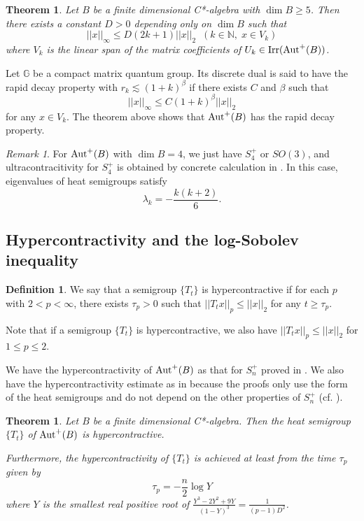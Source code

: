 \documentclass[12pt]{amsart}
\theoremstyle{plain} %
\newtheorem{theorem}[equation]{Theorem}
\theoremstyle{definition}
\newtheorem{definition}[equation]{Definition}
\theoremstyle{remark}
\newtheorem{remark}[equation]{Remark}
\begin{document}
\begin{theorem}
Let $B$ be a finite dimensional C*-algebra with $\dim B\geq5$. Then there exists a constant $D>0$ depending only on $\dim B$ such that 
\[||x||_{\infty}\leq D(2k+1)||x||_2\;\;(k\in \mathbb{N},\;x\in V_k)\]
where $V_k$ is the linear span of the matrix coefficients of $U_k\in{\rm Irr}({\rm Aut}^+(B))$.
\end{theorem}

Let $\mathbb{G}$ be a compact matrix quantum group. Its discrete dual is said to have the rapid decay property with $r_k\lesssim (1+k)^\beta$ if there exists $C$ and $\beta$ such that 
\[||x||_{\infty}\leq C(1+k)^{\beta}||x||_2\]
for any $x\in V_k$. 
The theorem above shows that ${\rm Aut}^+(B)$ has the rapid decay property. 

\begin{remark}
For ${\rm Aut}^+(B)$ with $\dim B=4$, we just have $S_4^+$ or $SO(3)$, and ultracontracitivity for $S_4^+$ is obtained by concrete calculation in \cite[Section 2.2]{FHLUZ}. In this case, eigenvalues of heat semigroups satisfy
\[\lambda_k=-\frac{k(k+2)}{6}.\]
\end{remark}

\subsection{Hypercontractivity and the log-Sobolev inequality}

\begin{definition}
We say that a semigroup $\{T_t\}$ is hypercontractive if for each $p$ with $2<p<\infty$, there exists $\tau_p>0$ such that $||T_tx||_p\leq||x||_2$ for any $t\geq\tau_p$.
\end{definition}

Note that if a semigroup $\{T_t\}$ is hypercontractive, we also have $||T_tx||_p\leq||x||_2$ for $1\leq p \leq 2$.


We have the hypercontractivity of ${\rm Aut}^+(B)$ as that for $S_n^+$ proved in \cite[Theorem 2.4]{FHLUZ}. We also have the hypercontractivity estimate as in \cite{FHLUZ} because the proofs only use the form of the heat semigroups and do not depend on the other properties of $S_n^+$ (cf. \cite[Proposition 2.5, Theorem 2.6]{FHLUZ}).


\begin{theorem}\label{hypercontractivity}
Let $B$ be a finite dimensional C*-algebra.
Then the heat semigroup $\{T_t\}$ of ${\rm Aut}^+(B)$ is hypercontractive.

Furthermore, the hypercontractivity of $\{T_t\}$ is achieved at least from the time $\tau_p$ given by
 \[\tau_p=-\frac{n}{2}\log{Y}\]
 where $Y$ is the smallest real positive root of $\frac{Y^3-2Y^2+9Y}{(1-Y)^3}=\frac{1}{(p-1)D^2}$.
\end{theorem}
\end{document}
